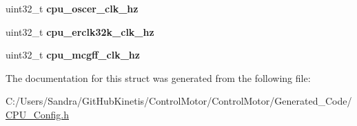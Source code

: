 \begin{DoxyCompactItemize}
\item 
uint32\+\_\+t {\bfseries cpu\+\_\+oscer\+\_\+clk\+\_\+hz}\hypertarget{struct_t_cpu_clock_configuration_a8573f3896f85f97201ef2d6252d99905}{}\label{struct_t_cpu_clock_configuration_a8573f3896f85f97201ef2d6252d99905}

\item 
uint32\+\_\+t {\bfseries cpu\+\_\+erclk32k\+\_\+clk\+\_\+hz}\hypertarget{struct_t_cpu_clock_configuration_a3f68e3893f7dec551e938a909929687b}{}\label{struct_t_cpu_clock_configuration_a3f68e3893f7dec551e938a909929687b}

\item 
uint32\+\_\+t {\bfseries cpu\+\_\+mcgff\+\_\+clk\+\_\+hz}\hypertarget{struct_t_cpu_clock_configuration_a5bd9b1235d0f85073ed01c126782d898}{}\label{struct_t_cpu_clock_configuration_a5bd9b1235d0f85073ed01c126782d898}

\end{DoxyCompactItemize}


The documentation for this struct was generated from the following file\+:\begin{DoxyCompactItemize}
\item 
C\+:/\+Users/\+Sandra/\+Git\+Hub\+Kinetis/\+Control\+Motor/\+Control\+Motor/\+Generated\+\_\+\+Code/\hyperlink{_c_p_u___config_8h}{C\+P\+U\+\_\+\+Config.\+h}\end{DoxyCompactItemize}

